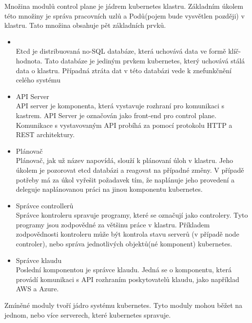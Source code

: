 Množina modulů control plane je jádrem kubernetes klastru. Základním úkolem této množiny je správa pracovních uzlů a Podů(pojem bude vysvětlen později) v klastru. \cite{the-kubernetes-authors_2022}\cite{a2022_kubernetes} Tato množina obsahuje pět základních prvků.
\begin{itemize}
    \item {}\\
    Etcd je distribuovaná no-SQL databáze, která uchovává data  ve formě klíč-hodnota. Tato databáze je jediným prvkem kubernetes, který uchovává stálá data o klastru. Případná ztráta dat v této databázi vede k znefunkčnění celého systému
    \item API Server\\
    API server je komponenta, která vystavuje rozhraní pro komunikaci s kastrem. API Server je označován jako front-end pro control plane. Komunikace s vystavovaným API probíhá za pomocí protokolu HTTP a REST architektury. 
    \item Plánovač\\
    Plánovač, jak už název napovídá, slouží k plánovaní úloh v klastru. Jeho úkolem je pozorovat etcd databázi a reagovat na případné změny. V případě potřeby má za úkol vyřešit požadavek tím, že naplánuje jeho provedení a deleguje naplánovanou práci na jinou komponentu kubernetes.  
    \item Správce controllerů\\
    Správce kontroleru spravuje programy, které se označují jako controlery. Tyto programy jsou zodpovědné za většinu práce v klastru. Příkladem zodpovědnosti kontroleru může být kontrola stavu serverů (v případě node controler), nebo správa jednotlivých objektů(né komponent) kubernetes. 
    \item Správce klaudu\\
    Poslední komponentou je správce klaudu. Jedná se o komponentu, která provádí komunikaci s API rozhraním poskytovatelů klaudu, jako například AWS a Azure. 
\end{itemize}
Zmíněné moduly tvoří jádro systému kubernetes. Tyto moduly mohou běžet na jednom, nebo více serverech, které kubernetes spravuje.

